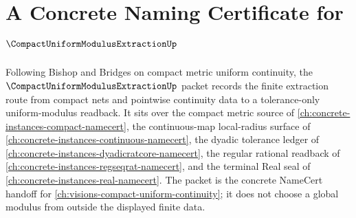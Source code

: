 \chapter{A Concrete Naming Certificate for $\CompactUniformModulusExtractionUp$}
\label{ch:concrete-instances-compact-uniform-modulus-extraction-namecert}

Following Bishop and Bridges on compact metric uniform continuity, the $\CompactUniformModulusExtractionUp$ packet records the finite extraction route from compact nets and pointwise continuity data to a tolerance-only uniform-modulus readback. It sits over the compact metric source of \autoref{ch:concrete-instances-compact-namecert}, the continuous-map local-radius surface of \autoref{ch:concrete-instances-continuous-namecert}, the dyadic tolerance ledger of \autoref{ch:concrete-instances-dyadicratcore-namecert}, the regular rational readback of \autoref{ch:concrete-instances-regseqrat-namecert}, and the terminal Real seal of \autoref{ch:concrete-instances-real-namecert}. The packet is the concrete NameCert handoff for \autoref{ch:visions-compact-uniform-continuity}; it does not choose a global modulus from outside the displayed finite data.

